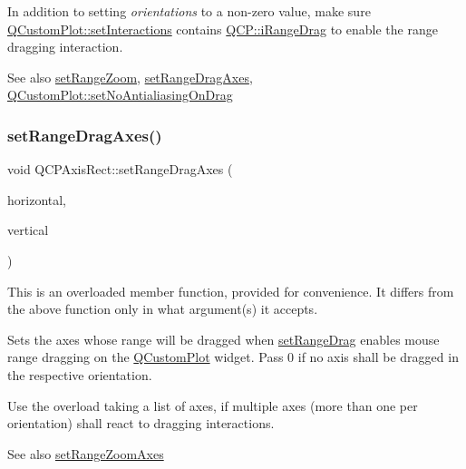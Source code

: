 In addition to setting {\itshape orientations} to a non-\/zero value, make sure \hyperlink{classQCustomPlot_a5ee1e2f6ae27419deca53e75907c27e5}{Q\+Custom\+Plot\+::set\+Interactions} contains \hyperlink{namespaceQCP_a2ad6bb6281c7c2d593d4277b44c2b037a2c4432b9aceafb94000be8d1b589ef18}{Q\+C\+P\+::i\+Range\+Drag} to enable the range dragging interaction.

\begin{DoxySeeAlso}{See also}
\hyperlink{classQCPAxisRect_a7960a9d222f1c31d558b064b60f86a31}{set\+Range\+Zoom}, \hyperlink{classQCPAxisRect_a648cce336bd99daac4a5ca3e5743775d}{set\+Range\+Drag\+Axes}, \hyperlink{classQCustomPlot_a775bdcb6329d44701aeaa6135b0e5265}{Q\+Custom\+Plot\+::set\+No\+Antialiasing\+On\+Drag} 
\end{DoxySeeAlso}
\mbox{\label{classQCPAxisRect_a648cce336bd99daac4a5ca3e5743775d}} 
\subsubsection{\texorpdfstring{set\+Range\+Drag\+Axes()}{setRangeDragAxes()}\hspace{0.1cm}{\footnotesize\ttfamily [1/3]}}
{\footnotesize\ttfamily void Q\+C\+P\+Axis\+Rect\+::set\+Range\+Drag\+Axes (\begin{DoxyParamCaption}\item[{\hyperlink{classQCPAxis}{Q\+C\+P\+Axis} $\ast$}]{horizontal,  }\item[{\hyperlink{classQCPAxis}{Q\+C\+P\+Axis} $\ast$}]{vertical }\end{DoxyParamCaption})}

This is an overloaded member function, provided for convenience. It differs from the above function only in what argument(s) it accepts.

Sets the axes whose range will be dragged when \hyperlink{classQCPAxisRect_ae6aef2f7211ba6097c925dcd26008418}{set\+Range\+Drag} enables mouse range dragging on the \hyperlink{classQCustomPlot}{Q\+Custom\+Plot} widget. Pass 0 if no axis shall be dragged in the respective orientation.

Use the overload taking a list of axes, if multiple axes (more than one per orientation) shall react to dragging interactions.

\begin{DoxySeeAlso}{See also}
\hyperlink{classQCPAxisRect_a9442cca2aa358405f39a64d51eca13d2}{set\+Range\+Zoom\+Axes} 
\end{DoxySeeAlso}
\mbox{\label{classQCPAxisRect_ab756bc5f129115fa3e8783617292fc1a}} 
